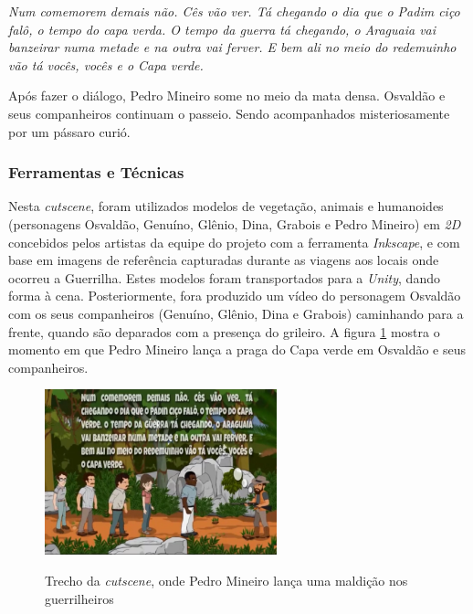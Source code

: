 \noindent
\textit{Num comemorem demais não. Cês vão ver. Tá chegando o dia que o Padim ciço falô, o tempo do capa verda. O tempo da guerra tá chegando, o Araguaia vai banzeirar numa metade e na outra vai ferver. E bem ali no meio do redemuinho vão tá vocês, vocês e o Capa verde.}

Após fazer o diálogo, Pedro Mineiro some no meio da mata densa. Osvaldão e seus companheiros continuam o passeio. Sendo acompanhados misteriosamente por um pássaro curió.

\subsubsection{Ferramentas e Técnicas}

Nesta \textit{cutscene}, foram utilizados modelos de vegetação, animais e humanoides (personagens Osvaldão, Genuíno, Glênio, Dina, Grabois e Pedro Mineiro) em \textit{2D} concebidos pelos artistas da equipe do projeto com a ferramenta \textit{Inkscape}, e com base em imagens de referência capturadas durante as viagens aos locais onde ocorreu a Guerrilha. Estes modelos foram transportados para a \textit{Unity}, dando forma à cena. Posteriormente, fora produzido um vídeo do personagem Osvaldão com os seus companheiros (Genuíno, Glênio, Dina e Grabois) caminhando para a frente, quando são deparados com a presença do grileiro. A figura \ref{fig:cutscene2-fase1} mostra o momento em que Pedro Mineiro lança a praga do Capa verde em Osvaldão e seus companheiros.

\begin{figure}[H]
	\centering
	\caption{Trecho da \textit{cutscene}, onde Pedro Mineiro lança uma maldição nos guerrilheiros}
	\includegraphics[width=0.6\textwidth]{figuras/cutscene2_fase1.png}
	\label{fig:cutscene2-fase1}
	{}
\end{figure}

